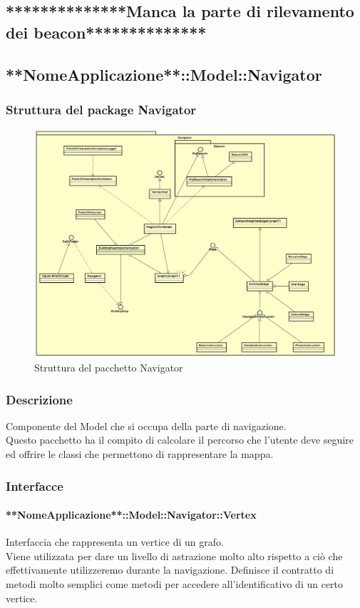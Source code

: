 \documentclass[../SpecificaTecnica.tex]{subfiles}
\begin{document}
	\subsection{**************Manca la parte di rilevamento dei beacon**************}
	\newpage
	\subsection{**NomeApplicazione**::Model::Navigator}
		\subsubsection{Struttura del package Navigator}
		\begin{figure}[!h]
			\centering
			\includegraphics[scale=0.3]{diagrammi/Navigator.png}
				\caption{Struttura del pacchetto Navigator}
			\label{fig:Struttura_MVP}
		\end{figure} 
		\subsubsection{Descrizione}
			Componente del Model che si occupa della parte di navigazione. \\
			Questo pacchetto ha il compito di calcolare il percorso che l'utente deve seguire ed offrire le classi che permettono di rappresentare la mappa.
			\subsubsection{Interfacce}
				\paragraph{**NomeApplicazione**::Model::Navigator::Vertex}
					Interfaccia che rappresenta un vertice di un grafo. \\ 
					Viene utilizzata per dare un livello di astrazione molto alto rispetto a ciò che effettivamente utilizzeremo durante la navigazione. Definisce il contratto di metodi molto semplici come metodi per accedere all'identificativo di un certo vertice.
\end{document}

